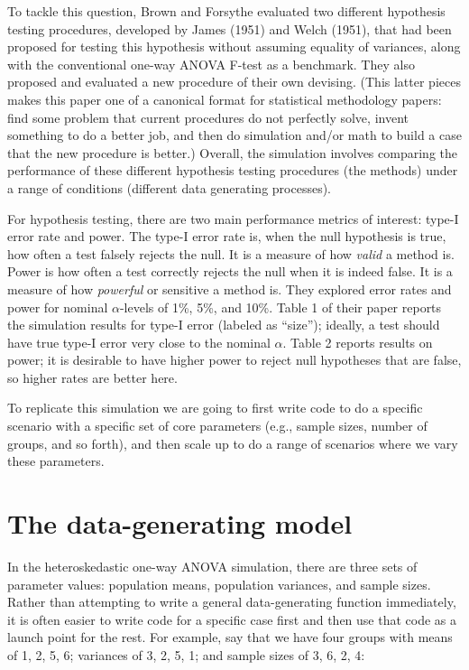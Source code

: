 \documentclass[
]{book}
\begin{document}
To tackle this question, Brown and Forsythe evaluated two different hypothesis testing procedures, developed by James (1951) and Welch (1951), that had been proposed for testing this hypothesis without assuming equality of variances, along with the conventional one-way ANOVA F-test as a benchmark.
They also proposed and evaluated a new procedure of their own devising.
(This latter pieces makes this paper one of a canonical format for statistical methodology papers: find some problem that current procedures do not perfectly solve, invent something to do a better job, and then do simulation and/or math to build a case that the new procedure is better.)
Overall, the simulation involves comparing the performance of these different hypothesis testing procedures (the methods) under a range of conditions (different data generating processes).

For hypothesis testing, there are two main performance metrics of interest: type-I error rate and power.
The type-I error rate is, when the null hypothesis is true, how often a test falsely rejects the null.
It is a measure of how \emph{valid} a method is.
Power is how often a test correctly rejects the null when it is indeed false.
It is a measure of how \emph{powerful} or sensitive a method is.
They explored error rates and power for nominal \(\alpha\)-levels of 1\%, 5\%, and 10\%.
Table 1 of their paper reports the simulation results for type-I error (labeled as ``size''); ideally, a test should have true type-I error very close to the nominal \(\alpha\).
Table 2 reports results on power; it is desirable to have higher power to reject null hypotheses that are false, so higher rates are better here.

To replicate this simulation we are going to first write code to do a specific scenario with a specific set of core parameters (e.g., sample sizes, number of groups, and so forth), and then scale up to do a range of scenarios where we vary these parameters.

\hypertarget{the-data-generating-model}{%
\section{The data-generating model}\label{the-data-generating-model}}

In the heteroskedastic one-way ANOVA simulation, there are three sets of parameter values: population means, population variances, and sample sizes.
Rather than attempting to write a general data-generating function immediately, it is often easier to write code for a specific case first and then use that code as a launch point for the rest.
For example, say that we have four groups with means of 1, 2, 5, 6; variances of 3, 2, 5, 1; and sample sizes of 3, 6, 2, 4:
\end{document}
